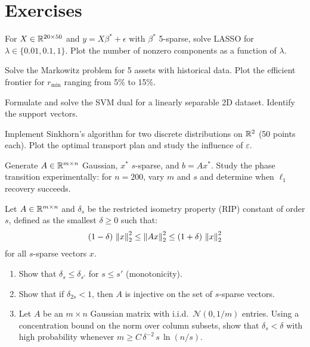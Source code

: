 \section{Exercises}

\begin{exercise}
For $X \in \mathbb{R}^{20 \times 50}$ and $y = X\beta^* + \epsilon$ with $\beta^*$
5-sparse, solve LASSO for $\lambda \in \{0.01, 0.1, 1\}$. Plot the number of
nonzero components as a function of $\lambda$.
\end{exercise}

\begin{exercise}
Solve the Markowitz problem for 5 assets with historical data. Plot the
efficient frontier for $r_{\min}$ ranging from 5\% to 15\%.
\end{exercise}

\begin{exercise}
Formulate and solve the SVM dual for a linearly separable 2D dataset.
Identify the support vectors.
\end{exercise}

\begin{exercise}
Implement Sinkhorn's algorithm for two discrete distributions on $\mathbb{R}^2$
(50 points each). Plot the optimal transport plan and study the influence
of $\varepsilon$.
\end{exercise}

\begin{exercise}
Generate $A \in \mathbb{R}^{m \times n}$ Gaussian, $x^*$ $s$-sparse, and
$b = Ax^*$. Study the phase transition experimentally: for $n = 200$, vary
$m$ and $s$ and determine when $\ell_1$ recovery succeeds.
\end{exercise}

\begin{exercise}
Let $A \in \mathbb{R}^{m \times n}$ and $\delta_s$ be the restricted isometry
property (RIP) constant of order $s$, defined as the smallest $\delta \geq 0$
such that:
\[
  (1 - \delta)\,\left\| x \right\|_2^2 \leq \left\| Ax \right\|_2^2 \leq (1 + \delta)\,\left\| x \right\|_2^2
\]
for all $s$-sparse vectors $x$.
\begin{enumerate}
  \item Show that $\delta_s \leq \delta_{s'}$ for $s \leq s'$ (monotonicity).
  \item Show that if $\delta_{2s} < 1$, then $A$ is injective on the set
        of $s$-sparse vectors.
  \item Let $A$ be an $m \times n$ Gaussian matrix with i.i.d.\
        $\mathcal{N}(0, 1/m)$ entries. Using a concentration bound on the
        norm over column subsets, show that $\delta_s < \delta$ with high
        probability whenever $m \geq C\,\delta^{-2}\,s\,\ln(n/s)$.
\end{enumerate}
\end{exercise}

